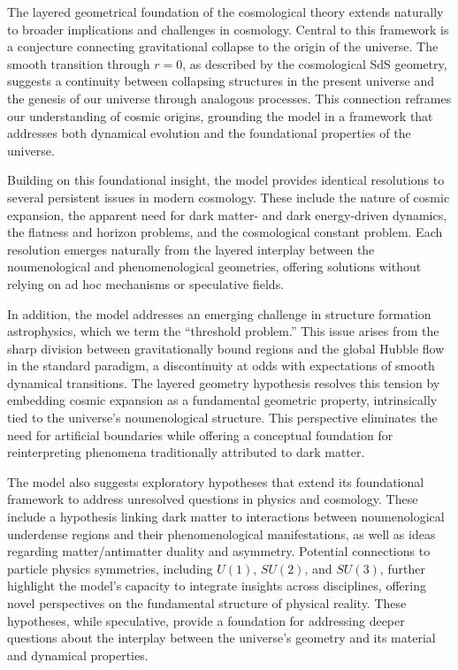 \documentclass[aps,rmp,groupedaddress,twocolumn,10pt]{revtex4-2}
\begin{document}
The layered geometrical foundation of the cosmological theory extends naturally to broader implications and challenges in cosmology. Central to this framework is a conjecture connecting gravitational collapse to the origin of the universe. The smooth transition through $r=0$, as described by the cosmological SdS geometry, suggests a continuity between collapsing structures in the present universe and the genesis of our universe through analogous processes. This connection reframes our understanding of cosmic origins, grounding the model in a framework that addresses both dynamical evolution and the foundational properties of the universe.

Building on this foundational insight, the model provides identical resolutions to several persistent issues in modern cosmology. These include the nature of cosmic expansion, the apparent need for dark matter- and dark energy-driven dynamics, the flatness and horizon problems, and the cosmological constant problem. Each resolution emerges naturally from the layered interplay between the noumenological and phenomenological geometries, offering solutions without relying on ad hoc mechanisms or speculative fields.

In addition, the model addresses an emerging challenge in structure formation astrophysics, which we term the ``threshold problem.'' This issue arises from the sharp division between gravitationally bound regions and the global Hubble flow in the standard paradigm, a discontinuity at odds with expectations of smooth dynamical transitions. The layered geometry hypothesis resolves this tension by embedding cosmic expansion as a fundamental geometric property, intrinsically tied to the universe's noumenological structure. This perspective eliminates the need for artificial boundaries while offering a conceptual foundation for reinterpreting phenomena traditionally attributed to dark matter.

The model also suggests exploratory hypotheses that extend its foundational framework to address unresolved questions in physics and cosmology. These include a hypothesis linking dark matter to interactions between noumenological underdense regions and their phenomenological manifestations, as well as ideas regarding matter/antimatter duality and asymmetry. Potential connections to particle physics symmetries, including $U(1)$, $SU(2)$, and $SU(3)$, further highlight the model's capacity to integrate insights across disciplines, offering novel perspectives on the fundamental structure of physical reality. These hypotheses, while speculative, provide a foundation for addressing deeper questions about the interplay between the universe's geometry and its material and dynamical properties.
\end{document}
